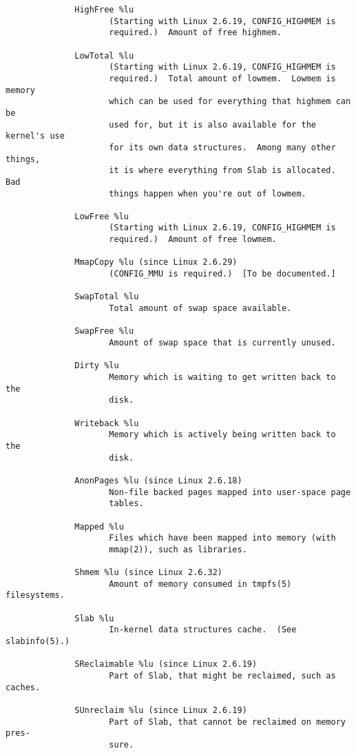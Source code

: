 \documentclass[]{article}
\begin{document}
\begin{verbatim}
              HighFree %lu
                     (Starting with Linux 2.6.19, CONFIG_HIGHMEM is
                     required.)  Amount of free highmem.

              LowTotal %lu
                     (Starting with Linux 2.6.19, CONFIG_HIGHMEM is
                     required.)  Total amount of lowmem.  Lowmem is memory
                     which can be used for everything that highmem can be
                     used for, but it is also available for the kernel's use
                     for its own data structures.  Among many other things,
                     it is where everything from Slab is allocated.  Bad
                     things happen when you're out of lowmem.

              LowFree %lu
                     (Starting with Linux 2.6.19, CONFIG_HIGHMEM is
                     required.)  Amount of free lowmem.

              MmapCopy %lu (since Linux 2.6.29)
                     (CONFIG_MMU is required.)  [To be documented.]

              SwapTotal %lu
                     Total amount of swap space available.

              SwapFree %lu
                     Amount of swap space that is currently unused.

              Dirty %lu
                     Memory which is waiting to get written back to the
                     disk.

              Writeback %lu
                     Memory which is actively being written back to the
                     disk.

              AnonPages %lu (since Linux 2.6.18)
                     Non-file backed pages mapped into user-space page
                     tables.

              Mapped %lu
                     Files which have been mapped into memory (with
                     mmap(2)), such as libraries.

              Shmem %lu (since Linux 2.6.32)
                     Amount of memory consumed in tmpfs(5) filesystems.

              Slab %lu
                     In-kernel data structures cache.  (See slabinfo(5).)

              SReclaimable %lu (since Linux 2.6.19)
                     Part of Slab, that might be reclaimed, such as caches.

              SUnreclaim %lu (since Linux 2.6.19)
                     Part of Slab, that cannot be reclaimed on memory pres‐
                     sure.


\end{verbatim}
\end{document}
